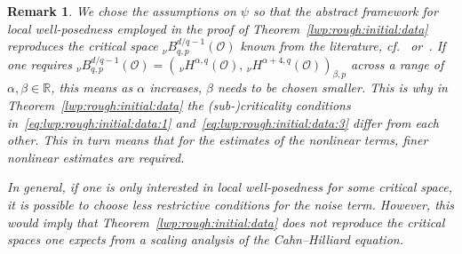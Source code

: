 \documentclass[reqno]{amsart}
\newtheorem{remark}[Satz]{Remark}
\newcommand{\R}{\mathbb{R}}
\newcommand{\sO}{\mathscr{O}}
\newcommand{\1}{\mathbf{1}}
\newcommand{\nH}{\ensuremath{\,_\nu H}}
\newcommand{\bpsn}[1]{\ensuremath{\nH^{#1}(\sO)}}
\begin{document}
    \begin{remark}
    We chose the assumptions on $\psi$ so that the abstract framework for local well-posedness employed in the proof of Theorem~\ref{lwp:rough:initial:data} reproduces the critical space $_\nu B^{d/q-1}_{q,p}(\sO)$ known from the literature, cf.~\cite[Section 7]{agrestiNonlinearParabolicStochastic2022} or~\cite{agrestiNonlinearSPDEsMaximal2025}.
    If one requires $_\nu B^{d/q-1}_{q,p}(\sO)=(\bpsn{\alpha,q},\bpsn{\alpha+4,q})_{\beta,p}$ across a range of $\alpha,\beta\in \R$, this means as $\alpha$ increases, $\beta$ needs to be chosen smaller. 
    This is why in Theorem~\ref{lwp:rough:initial:data} the (sub-)criticality conditions in~\eqref{eq:lwp:rough:initial:data:1} and~\eqref{eq:lwp:rough:initial:data:3} differ from each other. 
    This in turn means that for the estimates of the nonlinear terms, finer nonlinear estimates are required.
    
        In general, if one is only interested in local well-posedness for \emph{some} critical space, it is possible to choose less restrictive conditions for the noise term.
        However, this would imply that Theorem~\ref{lwp:rough:initial:data} does not reproduce the critical spaces one expects from a scaling analysis of the Cahn--Hilliard equation. 
    \end{remark}
\end{document}
